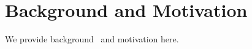 \section{Background and Motivation}\label{Se:background}
We provide background~\cite{Aho:book:2006} and motivation here.
